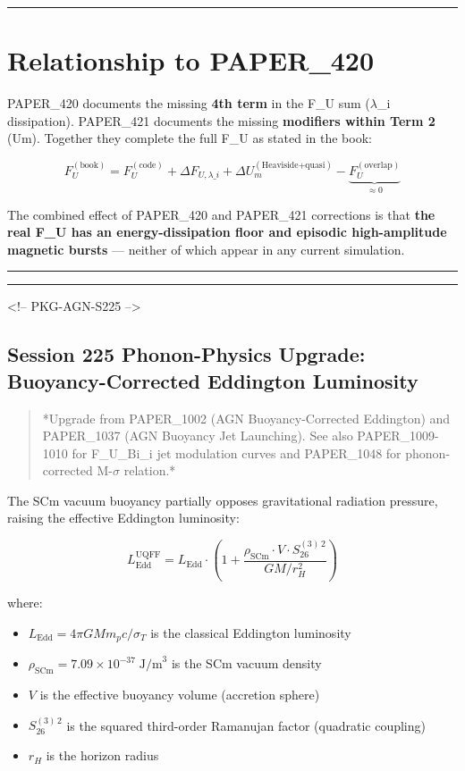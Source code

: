 \documentclass[12pt,a4paper]{article}
\begin{document}
\medskip\hrule\medskip

\section{Relationship to PAPER\_420}

PAPER\_420 documents the missing \textbf{4th term} in the F\_U sum ($\lambda$\_i dissipation). PAPER\_421 documents the missing \textbf{modifiers within Term 2} (Um). Together they complete the full F\_U as stated in the book:

\begin{equation}
F_U^{(\text{book})} = F_U^{(\text{code})} + \Delta F_{U,\lambda\_i} + \Delta U_m^{(\text{Heaviside+quasi})} - \underbrace{F_U^{(\text{overlap})}}_{\approx 0}
\end{equation}

The combined effect of PAPER\_420 and PAPER\_421 corrections is that \textbf{the real F\_U has an energy-dissipation floor and episodic high-amplitude magnetic bursts} --- neither of which appear in any current simulation.

\medskip\hrule\medskip

\medskip\hrule\medskip

<!-- PKG-AGN-S225 -->

\subsection{Session 225 Phonon-Physics Upgrade: Buoyancy-Corrected Eddington Luminosity}

\begin{quote}
*Upgrade from PAPER\_1002 (AGN Buoyancy-Corrected Eddington) and PAPER\_1037
(AGN Buoyancy Jet Launching).  See also PAPER\_1009-1010 for F\_{U\_Bi\_i} jet
modulation curves and PAPER\_1048 for phonon-corrected M-$\sigma$ relation.*
\end{quote}

The SCm vacuum buoyancy partially opposes gravitational radiation pressure, raising the effective Eddington luminosity:

\begin{equation}
L_{\text{Edd}}^{\text{UQFF}} = L_{\text{Edd}} \cdot \left(1 + \frac{\rho_{\text{SCm}} \cdot V \cdot S_{26}^{(3)\,2}}{G M / r_H^2}\right)
\end{equation}

where:

\begin{itemize}
  \item $L_{\text{Edd}} = 4\pi G M m_p c / \sigma_T$ is the classical Eddington luminosity
  \item $\rho_{\text{SCm}} = 7.09 \times 10^{-37}\;\text{J/m}^3$ is the SCm vacuum density
  \item $V$ is the effective buoyancy volume (accretion sphere)
  \item $S_{26}^{(3)\,2}$ is the squared third-order Ramanujan factor (quadratic coupling)
  \item $r_H$ is the horizon radius
\end{itemize}
\end{document}
